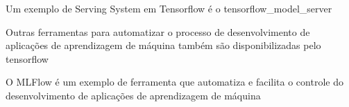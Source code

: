 \documentclass[aspectratio=169]{beamer} %
\begin{document}
 {

Um exemplo de Serving System em Tensorflow é o tensorflow\_model\_server

\begin{itemize}



\end{itemize}

Outras ferramentas para automatizar o processo de desenvolvimento de aplicações de aprendizagem de máquina também são disponibilizadas pelo tensorflow

}

 {

O MLFlow é um exemplo de ferramenta que automatiza e facilita o controle do desenvolvimento de aplicações de aprendizagem de máquina

\begin{itemize}

\end{itemize}
}
\end{document}
